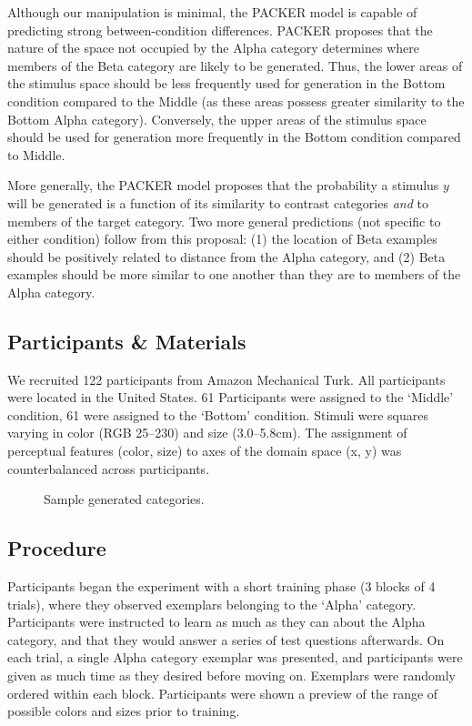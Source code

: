 \documentclass[10pt,letterpaper]{article}
\newcommand\inputpgf[2]{{
\let\pgfimageWithoutPath\pgfimage
\renewcommand{\pgfimage}[2][]{\pgfimageWithoutPath[##1]{#1/##2}}

}}
\begin{document}
Although our manipulation is minimal, the PACKER model is capable of predicting strong between-condition differences. PACKER proposes that the nature of the space not occupied by the Alpha category determines where members of the Beta category are likely to be generated. Thus, the lower areas of the stimulus space should be less frequently used for generation in the Bottom condition compared to the Middle (as these areas possess greater similarity to the Bottom Alpha category). Conversely, the upper areas of the stimulus space should be used for generation more frequently in the Bottom condition compared to Middle.

More generally, the PACKER model proposes that the probability a stimulus $y$ will be generated is a function of its similarity to contrast categories \textit{and} to members of the target category. Two more general predictions (not specific to either condition) follow from this proposal: (1) the location of Beta examples should be positively related to distance from the Alpha category, and (2) Beta examples should be more similar to one another than they are to members of the Alpha category.

\subsection{Participants \& Materials}

We recruited 122 participants from Amazon Mechanical Turk. All participants were located in the United States. 61 Participants were assigned to the `Middle' condition, 61 were assigned to the `Bottom' condition. Stimuli were squares varying in color (RGB 25--230) and size (3.0--5.8cm). The assignment of perceptual features (color, size) to axes of the domain space (x, y) was counterbalanced across participants.

\begin{figure}[ht!]
    \begin{center}
    \inputpgf{figs/}{beta.samples.pgf}
    \caption{Sample generated categories. }
    \label{fig:beta.samples}
    \end{center}
\end{figure}


\subsection{Procedure}

Participants began the experiment with a short training phase (3 blocks of 4 trials), where they observed exemplars belonging to the `Alpha' category. Participants were instructed to learn as much as they can about the Alpha category, and that they would answer a series of test questions afterwards. On each trial, a single Alpha category exemplar was presented, and participants were given as much time as they desired before moving on. Exemplars were randomly ordered within each block. Participants were shown a preview of the range of possible colors and sizes prior to training.
\end{document}
